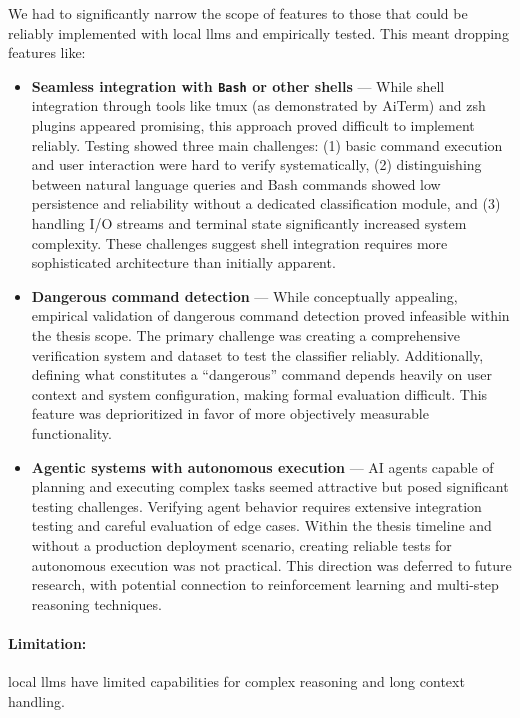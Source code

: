 We had to significantly narrow the scope of features to those that could be
reliably implemented with local \glspl{llm} and empirically tested. This meant
dropping features like:
\begin{itemize}
  \item \textbf{Seamless integration with \texttt{Bash} or other shells} ---
    While shell integration through tools like tmux (as demonstrated by AiTerm)
        and zsh plugins appeared promising, this approach proved difficult to
        implement reliably. Testing showed three main challenges: (1) basic
        command execution and user interaction were hard to verify
        systematically, (2) distinguishing between natural language queries and
        Bash commands showed low persistence and reliability without a dedicated
        classification module, and (3) handling I/O streams and terminal state
        significantly increased system complexity. These challenges suggest
        shell integration requires more sophisticated architecture than
        initially apparent.

  \item \textbf{Dangerous command detection} --- While conceptually appealing,
    empirical validation of dangerous command detection proved infeasible within
        the thesis scope. The primary challenge was creating a comprehensive
        verification system and dataset to test the classifier reliably.
        Additionally, defining what constitutes a ``dangerous'' command depends
        heavily on user context and system configuration, making formal
        evaluation difficult. This feature was deprioritized in favor of more
        objectively measurable functionality.

  \item \textbf{Agentic systems with autonomous execution} --- AI agents capable
    of planning and executing complex tasks seemed attractive but posed
        significant testing challenges. Verifying agent behavior requires
        extensive integration testing and careful evaluation of edge cases.
        Within the thesis timeline and without a production deployment scenario,
        creating reliable tests for autonomous execution was not practical. This
        direction was deferred to future research, with potential connection to
        reinforcement learning and multi-step reasoning techniques.
\end{itemize}

\paragraph{Limitation:} local \glspl{llm} have limited capabilities for complex
reasoning and long context handling.

